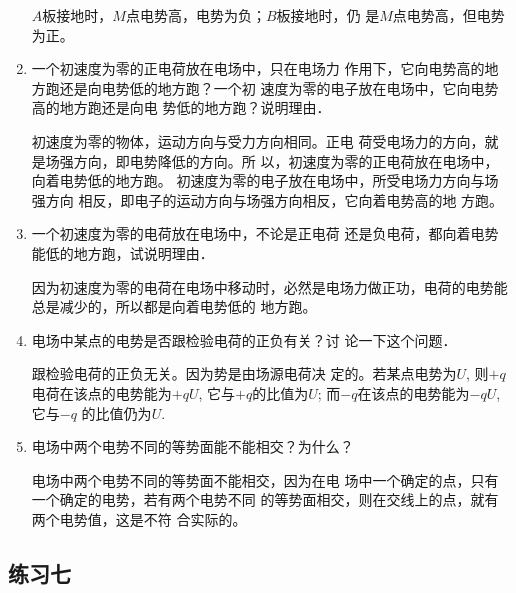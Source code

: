 \begin{enumerate}
\begin{solution}
    $A$板接地时，$M$点电势高，电势为负；$B$板接地时，仍
    是$M$点电势高，但电势为正。
\end{solution}

\item 一个初速度为零的正电荷放在电场中，只在电场力
作用下，它向电势高的地方跑还是向电势低的地方跑？一个初
速度为零的电子放在电场中，它向电势高的地方跑还是向电
势低的地方跑？说明理由．

\begin{solution}
    初速度为零的物体，运动方向与受力方向相同。正电
    荷受电场力的方向，就是场强方向，即电势降低的方向。所
    以，初速度为零的正电荷放在电场中，向着电势低的地方跑。
    初速度为零的电子放在电场中，所受电场力方向与场强方向
    相反，即电子的运动方向与场强方向相反，它向着电势高的地
    方跑。
\end{solution}

\item 一个初速度为零的电荷放在电场中，不论是正电荷
还是负电荷，都向着电势能低的地方跑，试说明理由．

\begin{solution}
    因为初速度为零的电荷在电场中移动时，必然是电场力做正功，电荷的电势能总是减少的，所以都是向着电势低的
    地方跑。
\end{solution}

\item 电场中某点的电势是否跟检验电荷的正负有关？讨
论一下这个问题．

\begin{solution}
    跟检验电荷的正负无关。因为势是由场源电荷决
    定的。若某点电势为$U$, 则$+q$电荷在该点的电势能为$+qU$,
    它与$+q$的比值为$U$; 而$-q$在该点的电势能为$-qU$, 它与$-q$
    的比值仍为$U$.
\end{solution}

\item 电场中两个电势不同的等势面能不能相交？为什么？

\begin{solution}
    电场中两个电势不同的等势面不能相交，因为在电
    场中一个确定的点，只有一个确定的电势，若有两个电势不同
    的等势面相交，则在交线上的点，就有两个电势值，这是不符
    合实际的。
\end{solution}

\end{enumerate}



\subsection{练习七}

